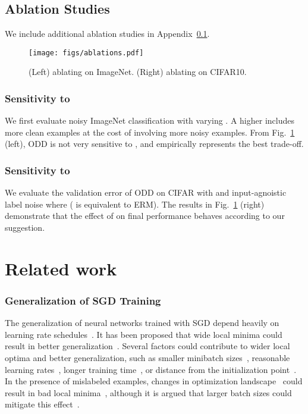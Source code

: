 \documentclass[a4paper,11pt]{article}
\begin{document}
\subsection{Ablation Studies}
\label{sec:exp-ablation}



We include additional ablation studies in Appendix~\ref{sec:exp-ablation}.

\begin{figure}
    \centering
    \texttt{[image: figs/ablations.pdf]}
    \caption{(Left) ablating  on ImageNet. (Right) ablating  on CIFAR10.}
    \label{fig:ablations}
\end{figure}


\subsubsection{Sensitivity to } We first evaluate noisy ImageNet classification with varying . A higher  includes more clean examples at the cost of involving more noisy examples. 
From Fig.~\ref{fig:ablations} (left), \textsc{ODD} is not very sensitive to , and empirically  represents the best trade-off. 


\subsubsection{Sensitivity to } We evaluate the validation error of \textsc{ODD} on CIFAR with  and  input-agnoistic label noise where  ( is equivalent to \textsc{ERM}). The results in Fig.~\ref{fig:ablations} (right) demonstrate that the effect of  on final performance behaves according to our suggestion. 













%
 \section{Related work}
\subsubsection{Generalization of SGD Training} The generalization of neural networks trained with SGD depend heavily on learning rate schedules~\cite{loshchilov2016sgdr}. It has been proposed that wide local minima could result in better generalization~\cite{hochreiter1995simplifying,chaudhari2016entropy,keskar2016on}. Several factors could contribute to wider local optima and better generalization, such as smaller minibatch sizes~\cite{keskar2016on}, reasonable learning rates~\cite{kleinberg2018an}, longer training time~\cite{hoffer2017train}, or distance from the initialization point~\cite{hoffer2017train}. 
In the presence of mislabeled examples, changes in optimization landscape~\cite{arpit2017a} could result in bad local minima~\cite{zhang2016understanding}, although it is argued that larger batch sizes could mitigate this effect~\cite{rolnick2017deep}.
\end{document}
